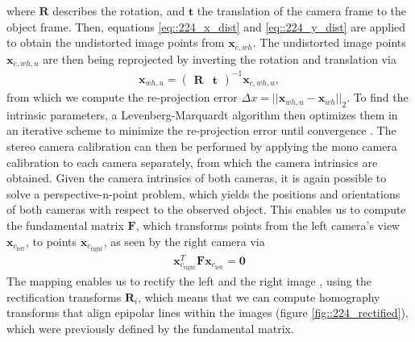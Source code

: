 where $\bm{R}$ describes the rotation, and $\bm{t}$ the translation of the camera frame to the object frame. Then, equations \ref{eq::224_x_dist} and \ref{eq::224_y_dist} are applied to obtain the undistorted image points from $\bm{x}_{c,wh}$. The undistorted image points $\bm{x}_{c,wh,u}$ are then being reprojected by inverting the rotation and translation via
\begin{align}
	\bm{x}_{wh,u} = \begin{pmatrix}
	\bm{R} & \bm{t}
	\end{pmatrix}^{-1}\bm{x}_{c,wh,u},
	\label{eq::224_reprojection}
\end{align}
from which we compute the re-projection error $\Delta x = ||\bm{x}_{wh,u} - \bm{x}_{wh}||_2$. To find the intrinsic parameters, a Levenberg-Marquardt algorithm then optimizes them in an iterative scheme to minimize the re-projection error until convergence \cite{zhang2000flexible}. The stereo camera calibration can then be performed by applying the mono camera calibration to each camera separately, from which the camera intrinsics are obtained. Given the camera intrinsics of both cameras, it is again possible to solve a perspective-n-point problem, which yields the positions and orientations of both cameras with respect to the observed object. This enables us to compute the fundamental matrix $\bm{F}$, which transforms points from the left camera's view $\bm{x}_{c_\text{left}}$, to points $\bm{x}_{c_\text{right}}$, as seen by the right camera via
\begin{align}
	\bm{x}_{c_\text{right}}^T\bm{F}\bm{x}_{c_\text{left}} = \bm{0}
\end{align}
The mapping enables us to rectify the left and the right image \cite{loop1999computing}, using the rectification transforms $\bm{R}_i$, which means that we can compute homography transforms that align epipolar lines within the images (figure \ref{fig::224_rectified}), which were previously defined by the fundamental matrix. 
